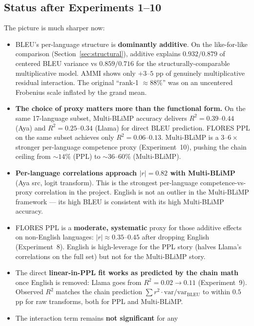 \documentclass[11pt]{article}
\begin{document}
\begin{center}
\section{Status after Experiments 1--10}

The picture is much sharper now:

\begin{itemize}
  \item BLEU's per-language structure is \textbf{dominantly additive}.
    On the like-for-like comparison (Section~\ref{sec:structural}),
    additive explains $0.932 / 0.879$ of centered BLEU variance vs
    $0.859 / 0.716$ for the structurally-comparable multiplicative model.
    AMMI shows only $+3$--$5$ pp of genuinely multiplicative residual
    interaction. The original ``rank-1 $\approx 88\%$'' was on an
    uncentered Frobenius scale inflated by the grand mean.
  \item \textbf{The choice of proxy matters more than the functional
    form.} On the same 17-language subset, Multi-BLiMP accuracy delivers
    $R^2 = 0.39$--$0.44$ (Aya) and $R^2 = 0.25$--$0.34$ (Llama) for
    direct BLEU prediction. FLORES PPL on the same subset achieves only
    $R^2 = 0.06$--$0.13$. Multi-BLiMP is a $3$--$6\times$ stronger
    per-language competence proxy (Experiment~10), pushing the chain
    ceiling from $\sim 14\%$ (PPL) to $\sim 36$--$60\%$ (Multi-BLiMP).
  \item \textbf{Per-language correlations approach $|r| = 0.82$ with
    Multi-BLiMP} (Aya src, logit transform). This is the strongest
    per-language competence-vs-proxy correlation in the project.
    English is not an outlier in the Multi-BLiMP framework --- its high
    BLEU is consistent with its high Multi-BLiMP accuracy.
  \item FLORES PPL is a \textbf{moderate, systematic} proxy for those
    additive effects on non-English languages: $|r| \approx
    0.35$--$0.45$ after dropping English (Experiment~8). English is
    high-leverage for the PPL story (halves Llama's correlations on the
    full set) but not for the Multi-BLiMP story.
  \item The direct \textbf{linear-in-PPL fit works as predicted by the
    chain math} once English is removed: Llama goes from $R^2 = 0.02
    \to 0.11$ (Experiment~9). Observed $R^2$ matches the chain
    prediction $\sum r^2 \cdot \mathrm{var}/\mathrm{var}_{\text{BLEU}}$
    to within $0.5$ pp for raw transforms, both for PPL and
    Multi-BLiMP.
  \item The interaction term remains \textbf{not significant} for any

\end{itemize}
\end{center}
\end{document}
